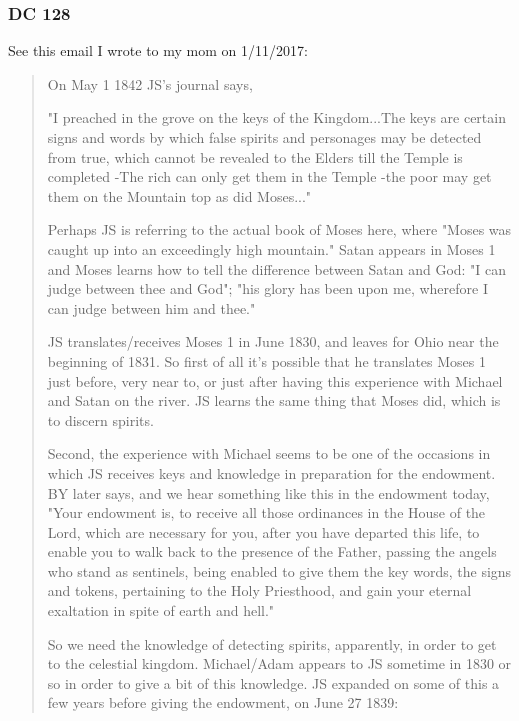 	\subsubsection{DC 128} %
	
		\begin{compactdesc}
		
		\item[20$\vert$] %
		\begin{compactdesc}
		\item[the voice of Michael...] See this email I wrote to my mom on 1/11/2017:
			\begin{quote}
				On May 1 1842 JS's journal says,

				"I preached in the grove on the keys of the Kingdom...The keys are certain signs and words by which false spirits and personages may be detected from true, which cannot be revealed to the Elders till the Temple is completed -The rich can only get them in the Temple -the poor may get them on the Mountain top as did Moses..."

				Perhaps JS is referring to the actual book of Moses here, where "Moses was caught up into an exceedingly high mountain." Satan appears in Moses 1 and Moses learns how to tell the difference between Satan and God: "I can judge between thee and God"; "his glory has been upon me, wherefore I can judge between him and thee."

				JS translates/receives Moses 1 in June 1830, and leaves for Ohio near the beginning of 1831. So first of all it's possible that he translates Moses 1 just before, very near to, or just after having this experience with Michael and Satan on the river. JS learns the same thing that Moses did, which is to discern spirits.

				Second, the experience with Michael seems to be one of the occasions in which JS receives keys and knowledge in preparation for the endowment. BY later says, and we hear something like this in the endowment today, "Your endowment is, to receive all those ordinances in the House of the Lord, which are necessary for you, after you have departed this life, to enable you to walk back to the presence of the Father, passing the angels who stand as sentinels, being enabled to give them the key words, the signs and tokens, pertaining to the Holy Priesthood, and gain your eternal exaltation in spite of earth and hell."

				So we need the knowledge of detecting spirits, apparently, in order to get to the celestial kingdom. Michael/Adam appears to JS sometime in 1830 or so in order to give a bit of this knowledge. JS expanded on some of this a few years before giving the endowment, on June 27 1839:


\end{quote}
\end{compactdesc}
\end{compactdesc}

